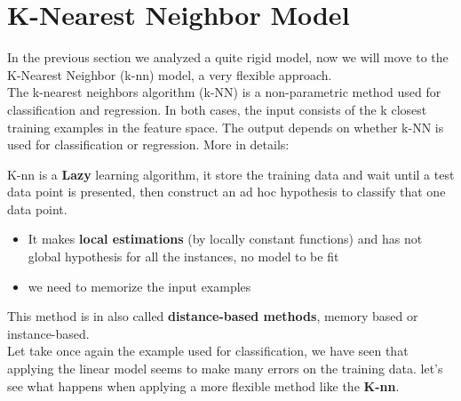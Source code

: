 \documentclass[../main.tex]{subfiles}
\begin{document}
\section{K-Nearest Neighbor Model}
In the previous section we analyzed a quite rigid model, now we will move to the K-Nearest Neighbor (k-nn) model, a very flexible approach.\\

The k-nearest neighbors algorithm (k-NN) is a non-parametric method used for classification and regression. In both cases, the input consists of the k closest training examples in the feature space. The output depends on whether k-NN is used for classification or regression. More in details:

K-nn is a \textbf{Lazy} learning algorithm, it store the training data and wait until a test data point is presented, then construct an ad hoc hypothesis to classify that one data point.
\begin{itemize}
    \item It makes \textbf{local estimations} (by locally constant functions) and has not global hypothesis for all the instances, no model to be fit
    \item we need to memorize the input examples
\end{itemize} 
This method is in also called \textbf{distance-based methods}, memory based or instance-based.\\ 




Let take once again the example used for classification, we have seen that applying the linear model seems to make many errors on the training data. let's see what happens when applying a more flexible method like the \textbf{K-nn}.
\end{document}
